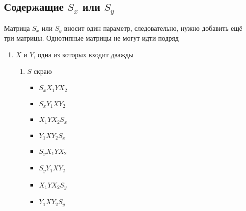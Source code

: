 
\subsection{Содержащие $S_x$ или $S_y$}

Матрица $S_x$ или $S_y$ вносит один параметр, следовательно, нужно добавить ещё три матрицы.
Однотипные матрицы не могут идти подряд

\begin{enumerate}
	\item $X$ и $Y$, одна из которых входит дважды
	\begin{enumerate}
		\item $S$ скраю
		\begin{itemize}
			\item $S_x X_1YX_2$
			\item $S_x Y_1XY_2$
			\item $X_1YX_2 S_x$
			\item $Y_1XY_2 S_x$
			\item $S_y X_1YX_2$
			\item $S_y Y_1XY_2$
			\item $X_1YX_2 S_y$
			\item $Y_1XY_2 S_y$
		\end{itemize}
	\end{enumerate}
\end{enumerate}